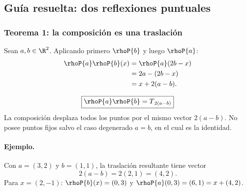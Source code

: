 \subsection{Guía resuelta: dos reflexiones puntuales}

\subsubsection{Teorema 1: la composición es una traslación}

Sean \(a,b\in\R^2\). Aplicando primero \(\rhoP{b}\) y luego \(\rhoP{a}\):
\[
\begin{aligned}
  \rhoP{a}\rhoP{b}(x)
  &=\rhoP{a}(2b-x)\\
  &=2a-(2b-x)\\
  &=x+2(a-b).
\end{aligned}
\]

\begin{resultado}[Conclusión]
\[
  \boxed{\rhoP{a}\rhoP{b}=T_{\,2(a-b)}}
\]
La composición desplaza todos los puntos por el mismo vector \(2(a-b)\). No posee puntos
fijos salvo el caso degenerado \(a=b\), en el cual es la identidad.
\end{resultado}

\begin{center}
\end{center}

\paragraph{Ejemplo.}
Con \(a=(3,2)\) y \(b=(1,1)\), la traslación resultante tiene vector
\[
  2(a-b)=2(2,1)=(4,2).
\]
Para \(x=(2,-1)\): \(\rhoP{b}(x)=(0,3)\) y
\(\rhoP{a}(0,3)=(6,1)=x+(4,2)\).

